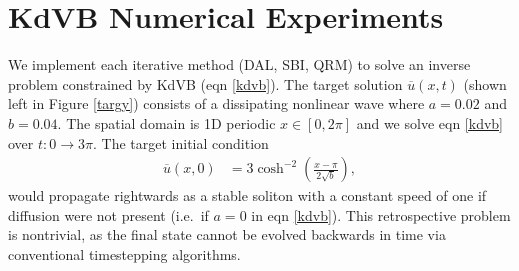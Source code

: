 \documentclass[%
 reprint,
 amsmath,amssymb,
 aps,
 pre,
]{revtex4-2}
\begin{document}
\section{KdVB Numerical Experiments}\label{seckdvb}
We implement each iterative method (DAL, SBI, QRM) to solve an inverse problem constrained by KdVB (eqn \ref{kdvb}).
The target solution $\overline{u}(x,t)$ (shown left in Figure \ref{targy}) consists of a dissipating nonlinear wave where $a=0.02$ and $b=0.04$. 
The spatial domain is 1D periodic $x\in [0, 2\pi]$ and we solve eqn \ref{kdvb} over $t:0\to3\pi$.
The target initial condition
\begin{align}
  \overline{u}(x,0) &= 3\cosh^{-2} \left( \frac{x-\pi}{2\sqrt{b}} \right) \label{kdvbic},
\end{align}
would propagate rightwards as a stable soliton with a constant speed of one if diffusion were not present (i.e.~if $a=0$ in eqn \ref{kdvb}).
This retrospective problem is nontrivial, as the final state cannot be evolved backwards in time via conventional timestepping algorithms.
\end{document}
